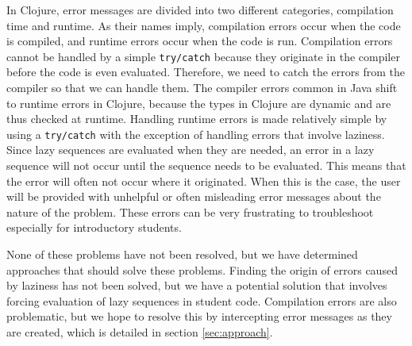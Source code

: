 \documentclass[12pt]{article}
\newcommand{\comment}[1]{{\bf \tt  {#1}}}
\newcommand{\emcomment}[1]{\textcolor{ForestGreen}{\comment{Elena: {#1}}}}
\begin{document}
In Clojure, error messages are divided into two different categories, compilation time and runtime. As their names imply, compilation errors occur when the code is compiled, and runtime errors occur when the code is run.
Compilation errors cannot be handled by a simple {\tt try/catch} because they originate in the compiler before the code is even evaluated. Therefore, we need to catch the errors from the compiler so that we can handle them. The compiler errors common in Java shift to runtime errors in Clojure, because the types in Clojure are dynamic and are thus checked at runtime.
Handling runtime errors is made relatively simple by using a {\tt try/catch} with the exception of handling errors that involve laziness. Since lazy sequences are evaluated when they are needed, an error in a lazy sequence will not occur until the sequence needs to be evaluated. This means that the error will often not occur where it originated. When this is the case, the user will be provided with unhelpful or often misleading error messages about the nature of the problem. These errors can be very frustrating to troubleshoot especially for introductory students. %

None of these problems have not been resolved, but we have determined approaches that should solve these problems. Finding the origin of errors caused by laziness has not been solved, but we have a potential solution that involves forcing evaluation of lazy sequences in student code. Compilation errors are also problematic, but we hope to resolve this by intercepting error messages as they are created, which is detailed in section \ref{sec:approach}.
 
\end{document}
